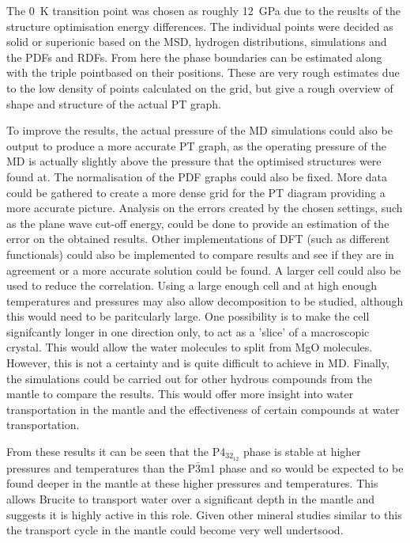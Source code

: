 \documentclass[a4paper,12pt]{article}
\begin{document}
The \SI{0}{\K} transition point was chosen as roughly \SI{12}{\GPa} due to the reuslts of the structure optimisation energy differences. The individual points were decided as solid or superionic based on the MSD, hydrogen distributions, simulations and the PDFs and RDFs. From here the phase boundaries can be estimated along with the triple pointbased on their positions. These are very rough estimates due to the low density of points calculated on the grid, but give a rough overview of shape and structure of the actual PT graph.

\bigskip

\noindent To improve the results, the actual pressure of the MD simulations could also be output to produce a more accurate PT graph, as the operating pressure of the MD is actually slightly above the pressure that the optimised structures were found at. The normalisation of the PDF graphs could also be fixed. More data could be gathered to create a more dense grid for the PT diagram providing a more accurate picture. Analysis on the errors created by the chosen settings, such as the plane wave cut-off energy, could be done to provide an estimation of the error on the obtained results. Other implementations of DFT (such as different functionals) could also be implemented to compare results and see if they are in agreement or a more accurate solution could be found. A larger cell could also be used to reduce the correlation. Using a large enough cell and at high enough temperatures and pressures may also allow decomposition to be studied, although this would need to be paritcularly large. One possibility is to make the cell signifcantly longer in one direction only, to act as a 'slice' of a macroscopic crystal. This would allow the water molecules to split from MgO molecules. However, this is not a certainty and is quite difficult to achieve in MD. Finally, the simulations could be carried out for other hydrous compounds from the mantle to compare the results. This would offer more insight into water transportation in the mantle and the effectiveness of certain compounds at water transportation.

From these results it can be seen that the P$4_32_12$ phase is stable at higher pressures and temperatures than the P$\bar3$m1 phase and so would be expected to be found deeper in the mantle at these higher pressures and temperatures. This allows Brucite to transport water over a significant depth in the mantle and suggests it is highly active in this role. Given other mineral studies similar to this the transport cycle in the mantle could become very well undertsood.
 
\end{document}
